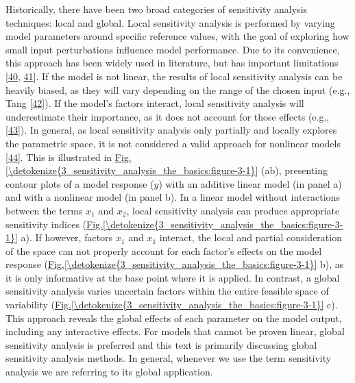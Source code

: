 \documentclass[letterpaper,10pt,english]{sphinxmanual}
\begin{document}
\sphinxAtStartPar
Historically, there have been two broad categories of sensitivity analysis techniques: local and global. Local sensitivity analysis is performed by varying model parameters around specific reference values, with the goal of exploring how small input perturbations influence model performance. Due to its convenience, this approach has been widely used in literature, but has important limitations {[}\hyperlink{cite.index:id18}{40}, \hyperlink{cite.index:id19}{41}{]}. If the model is not linear, the results of local sensitivity analysis can be heavily biased, as they will vary depending on the range of the chosen input (e.g., Tang  {[}\hyperlink{cite.index:id20}{42}{]}). If the model’s factors interact, local sensitivity analysis will underestimate their importance, as it does not account for those effects (e.g., {[}\hyperlink{cite.index:id23}{43}{]}). In general, as local sensitivity analysis only partially and locally explores the parametric space, it is not considered a valid approach for nonlinear models {[}\hyperlink{cite.index:id24}{44}{]}. This is illustrated in \hyperref[\detokenize{3_sensitivity_analysis_the_basics:figure-3-1}]{Fig.\@ \ref{\detokenize{3_sensitivity_analysis_the_basics:figure-3-1}}} (a\sphinxhyphen{}b), presenting contour plots of a model response (\(y\)) with an additive linear model (in panel a) and with a nonlinear model (in panel b). In a linear model without interactions between the terms \(x_1\) and \(x_2\), local sensitivity analysis can produce appropriate sensitivity indices (\hyperref[\detokenize{3_sensitivity_analysis_the_basics:figure-3-1}]{Fig.\@ \ref{\detokenize{3_sensitivity_analysis_the_basics:figure-3-1}}} a). If however, factors \(x_1\) and \(x_1\) interact, the local and partial consideration of the space can not properly account for each factor’s effects on the model response (\hyperref[\detokenize{3_sensitivity_analysis_the_basics:figure-3-1}]{Fig.\@ \ref{\detokenize{3_sensitivity_analysis_the_basics:figure-3-1}}} b), as it is only informative at the base point where it is applied. In contrast, a global sensitivity analysis varies uncertain factors within the entire feasible space of variability (\hyperref[\detokenize{3_sensitivity_analysis_the_basics:figure-3-1}]{Fig.\@ \ref{\detokenize{3_sensitivity_analysis_the_basics:figure-3-1}}} c). This approach reveals the global effects of each parameter on the model output, including any interactive effects. For models that cannot be proven linear, global sensitivity analysis is preferred and this text is primarily discussing global sensitivity analysis methods. In general, whenever we use the term sensitivity analysis we are referring to its global application.
\end{document}
